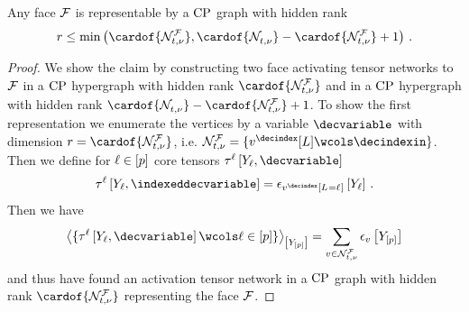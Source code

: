\begin{lemma}
    \label{lem:CPfaceRepresentationBound} %
    Any face $\mathcal{F}$ is representable by a $\mathrm{CP}$ graph with hidden rank
    \begin{align*}
        r
        \leq \min\left(\cardof{\genfaceimset},\cardof{\genimset}-\cardof{\genfaceimset}+1\right) \, .
    \end{align*}
\end{lemma}
\begin{proof}
    We show the claim by constructing two face activating tensor networks to $\mathcal{F}$ in a $\mathrm{CP}$ hypergraph with hidden rank $\cardof{\genfaceimset}$ and in a $\mathrm{CP}$ hypergraph with hidden rank $\cardof{\genimset}-\cardof{\genfaceimset}+1$.
    To show the first representation we enumerate the vertices by a variable $\decvariable$ with dimension $r=\cardof{\genfaceimset}$, i.e. $\genfaceimset = \{v^{\decindex}[\selvariable] \wcols \decindexin\}$.
    Then we define for $\ell\in[p]$ core tensors $\hypercoreofat{\selindex}{\headvariableof{\selindex},\decvariable}$
    \begin{align*}
        \hypercoreofat{\selindex}{\headvariableof{\selindex},\indexeddecvariable} = \onehotmapofat{\imelementofat{\decindex}{\indexedselvariable}}{\headvariableof{\selindex}} \, .
    \end{align*}
    Then we have
    \begin{align*}
        \contractionof{\{\hypercoreofat{\selindex}{\headvariableof{\selindex},\decvariable}\wcols\selindexin\}}{\headvariables}
        =\sum_{\imelement\in\genfaceimset} \onehotmapofat{\imelement}{\headvariables}
    \end{align*}
    and thus have found an activation tensor network in a $\mathrm{CP}$ graph with hidden rank $\cardof{\genfaceimset}$ representing the face $\mathcal{F}$.


\end{proof}
